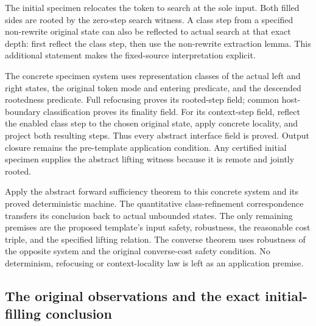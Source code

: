 
The initial specimen relocates the token to search at the sole input.
Both filled sides are rooted by the zero-step search witness. A class step
from a specified non-rewrite original state can also be reflected to actual
search at that exact depth: first reflect the class step, then use the
non-rewrite extraction lemma. This additional statement makes the fixed-source
interpretation explicit.




The concrete specimen system uses representation classes of the actual
left and right states, the original token mode and entering predicate, and
the descended rootedness predicate. Full refocusing proves its rooted-step
field; common host-boundary classification proves its finality field.
For its context-step field, reflect the enabled class step to the chosen
original state, apply concrete locality, and project both resulting steps.
Thus every abstract interface field is proved. Output closure remains the
pre-template application condition. Any certified initial specimen supplies
the abstract lifting witness because it is remote and jointly rooted.



Apply the abstract forward sufficiency theorem to this concrete system
and its proved deterministic machine. The quantitative class-refinement
correspondence transfers its conclusion back to actual unbounded states.
The only remaining premises are the proposed template's input safety,
robustness, the reasonable cost triple, and the specified lifting relation.
The converse theorem uses robustness of the opposite system and the original
converse-cost safety condition. No determinism, refocusing or context-locality
law is left as an application premise.



\subsection{The original observations and the exact initial-filling conclusion}

